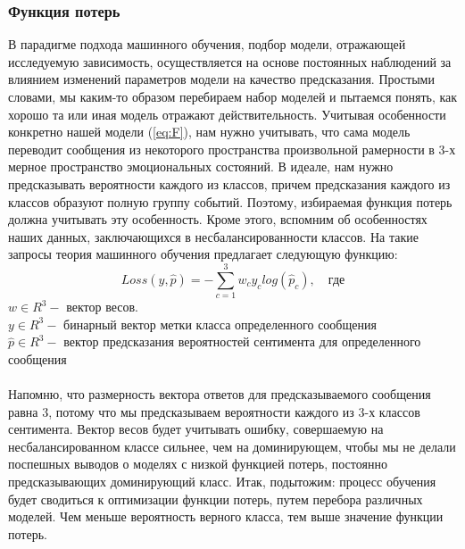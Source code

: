 \documentclass{article}
\begin{document}
\subsubsection{Функция потерь}
В парадигме подхода машинного обучения, подбор модели, отражающей исследуемую зависимость, осуществляется на основе постоянных наблюдений за влиянием изменений параметров модели на качество предсказания. Простыми словами, мы каким-то образом перебираем набор моделей и пытаемся понять, как хорошо та или иная модель отражают действительность. Учитывая особенности конкретно нашей модели (\ref{eq:F}), нам нужно учитывать, что сама модель переводит сообщения из некоторого пространства произвольной рамерности в 3-х мерное пространство эмоциональных состояний. В идеале, нам нужно предсказывать вероятности каждого из классов, причем предсказания каждого из классов образуют полную группу событий. Поэтому, избираемая функция потерь должна учитывать эту особенность. Кроме этого, вспомним об особенностях наших данных, заключающихся в несбалансированности классов. На такие запросы теория машинного обучения предлагает следующую функцию: \[ Loss(y, \hat{p}) = - \sum_{c=1}^{3} w_c y_c log(\hat{p}_c), \quad \text{где}\]
$w \in R^3 - $ вектор весов. \\
$y \in R^{3} - $ бинарный вектор метки класса определенного сообщения \\ $\hat{p} \in R^3 - $ вектор предсказания вероятностей сентимента для определенного сообщения \\\\
Напомню, что размерность вектора ответов для предсказываемого сообщения равна 3, потому что мы предсказываем вероятности каждого из 3-х классов сентимента. Вектор весов будет учитывать ошибку, совершаемую на несбалансированном классе сильнее, чем на доминирующем, чтобы мы не делали поспешных выводов о моделях с низкой функцией потерь, постоянно предсказывающих доминирующий класс. Итак, подытожим: процесс обучения будет сводиться к оптимизации функции потерь, путем перебора различных моделей. Чем меньше вероятность верного класса, тем выше значение функции потерь.
\end{document}
